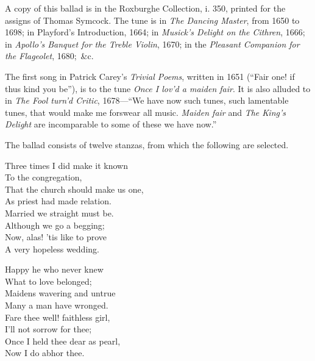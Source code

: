 

A copy of this ballad is in the Roxburghe Collection, i. 350, printed for the
assigns of Thomas Symcock. The tune is in \textit{The Dancing Master}, from 1650 to
1698; in Playford’s Introduction, 1664; in \textit{Musick’s Delight on the Cithren}, 1666;
in \textit{Apollo’s Banquet for the Treble Violin}, 1670; in the \textit{Pleasant Companion for
the Flageolet}, 1680;~\&c.

The first song in Patrick Carey’s \textit{Trivial Poems}, written in 1651 (“Fair one!
if thus kind you be”), is to the tune \textit{Once I lov’d a maiden fair}. It is also
alluded to in \textit{The Fool turn’d Critic}, 1678—“We have now such tunes, such
lamentable tunes, that would make me forswear all music. \textit{Maiden fair} and \textit{The
King’s Delight} are incomparable to some of these we have now.”

The ballad consists of twelve stanzas, from which the following are selected.




\settowidth{\versewidth}{That the church should make us one,}
\begin{dcverse}\begin{altverse}
Three times I did make it known\\
To the congregation,\\
That the church should make us one,\\
As priest had made relation.\\
Married we straight must be.\\
Although we go a begging;\\
Now, alas! ’tis like to prove\\
A very hopeless wedding.
\end{altverse}

\begin{altverse}
Happy he who never knew\\
What to love belonged;\\
Maidens wavering and untrue\\
Many a man have wronged.\\
Fare thee well! faithless girl,\\
I’ll not sorrow for thee;\\
Once I held thee dear as pearl,\\
Now I do abhor thee.
\end{altverse}
\end{dcverse}
\pagebreak

